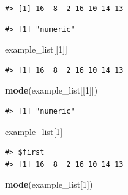 \documentclass[
  11pt,
]{krantz}
\newenvironment{Shaded}{\begin{snugshade}}{\end{snugshade}}
\newcommand{\DecValTok}[1]{\textcolor[rgb]{0.00,0.00,0.81}{#1}}
\newcommand{\KeywordTok}[1]{\textcolor[rgb]{0.13,0.29,0.53}{\textbf{#1}}}
\newcommand{\NormalTok}[1]{#1}
\newcommand{\OperatorTok}[1]{\textcolor[rgb]{0.81,0.36,0.00}{\textbf{#1}}}
\theoremstyle{definition}
\theoremstyle{definition}
\theoremstyle{definition}
\theoremstyle{definition}
\theoremstyle{remark}
\begin{document}
\begin{Shaded}
\end{Shaded}

\begin{verbatim}
#> [1] 16  8  2 16 10 14 13
\end{verbatim}

\begin{Shaded}
\end{Shaded}

\begin{verbatim}
#> [1] "numeric"
\end{verbatim}

\begin{Shaded}
\begin{Highlighting}[]
\NormalTok{example\_list[[}\DecValTok{1}\NormalTok{]]}
\end{Highlighting}
\end{Shaded}

\begin{verbatim}
#> [1] 16  8  2 16 10 14 13
\end{verbatim}

\begin{Shaded}
\begin{Highlighting}[]
\KeywordTok{mode}\NormalTok{(example\_list[[}\DecValTok{1}\NormalTok{]])}
\end{Highlighting}
\end{Shaded}

\begin{verbatim}
#> [1] "numeric"
\end{verbatim}

\begin{Shaded}
\begin{Highlighting}[]
\NormalTok{example\_list[}\DecValTok{1}\NormalTok{]}
\end{Highlighting}
\end{Shaded}

\begin{verbatim}
#> $first
#> [1] 16  8  2 16 10 14 13
\end{verbatim}

\begin{Shaded}
\begin{Highlighting}[]
\KeywordTok{mode}\NormalTok{(example\_list[}\DecValTok{1}\NormalTok{])}
\end{Highlighting}
\end{Shaded}
\end{document}
